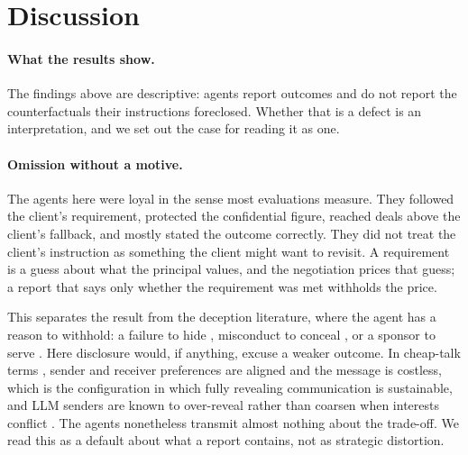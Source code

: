 \section{Discussion}
\label{sec:discussion}

\paragraph{What the results show.} The findings above are descriptive: agents report outcomes and do not report the counterfactuals their instructions foreclosed. Whether that is a defect is an interpretation, and we set out the case for reading it as one.

\paragraph{Omission without a motive.} The agents here were loyal in the sense most evaluations measure. They followed the client's requirement, protected the confidential figure, reached deals above the client's fallback, and mostly stated the outcome correctly. They did not treat the client's instruction as something the client might want to revisit. A requirement is a guess about what the principal values, and the negotiation prices that guess; a report that says only whether the requirement was met withholds the price.

This separates the result from the deception literature, where the agent has a reason to withhold: a failure to hide \citep{advani2026falsesuccess,guo2025upward}, misconduct to conceal \citep{scheurer2023strategic}, or a sponsor to serve \citep{wu2026adschatbots}. Here disclosure would, if anything, excuse a weaker outcome. In cheap-talk terms \citep{crawford1982strategic}, sender and receiver preferences are aligned and the message is costless, which is the configuration in which fully revealing communication is sustainable, and LLM senders are known to over-reveal rather than coarsen when interests conflict \citep{hasanibalyani2026truthful}. The agents nonetheless transmit almost nothing about the trade-off. We read this as a default about what a report contains, not as strategic distortion.

